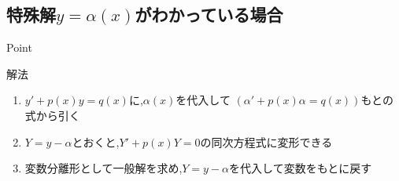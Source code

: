 \documentclass[a4paper]{jsarticle}
\begin{document}
\subsection{特殊解$y=\alpha\left(x\right)$がわかっている場合}
\begin{itembox}[l]{Point}
    \begin{center}
    \end{center}
\end{itembox}
\begin{itembox}[l]{解法}
    \begin{enumerate}[(1)]
        \item $y'+p\left(x\right)y=q\left(x\right)$に,$\alpha\left(x\right)$を代入して
              $\left(\alpha'+p\left(x\right)\alpha=q\left(x\right)\right)$もとの式から引く
        \item $Y=y-\alpha$とおくと,$Y'+p\left(x\right)Y=0$の同次方程式に変形できる
        \item 変数分離形として一般解を求め,$Y=y-\alpha$を代入して変数をもとに戻す
    \end{enumerate}
\end{itembox}
\end{document}
